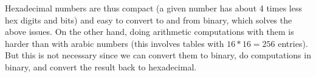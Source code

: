 Hexadecimal numbers are thus compact (a given number has about 4 times less hex
digits and bits) and easy to convert to and from binary, which solves the above
issues. On the other hand, doing arithmetic computations with them is harder
than with arabic numbers (this involves tables with $16*16=256$ entries). But
this is not necessary since we can convert them to binary, do computations in
binary, and convert the result back to hexadecimal.

